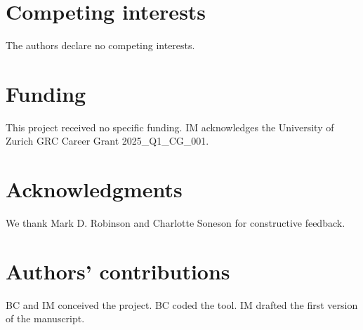 \documentclass[10pt]{article}
\newcommand{\beginsupplement}{%
        \setcounter{table}{0}
        \renewcommand{\thetable}{S\arabic{table}}%
        \setcounter{figure}{0}
        \renewcommand{\thefigure}{S\arabic{figure}}%
        \setcounter{section}{0}
        \renewcommand{\thesection}{S\arabic{section}}%
      }
\begin{document}
\section*{Competing interests}

The authors declare no competing interests.

\section*{Funding}

This project received no specific funding. IM acknowledges the University of Zurich GRC Career Grant 2025\_Q1\_CG\_001.

\section*{Acknowledgments}

We thank Mark D. Robinson and Charlotte Soneson for constructive feedback.

\section*{Authors' contributions}

BC and IM conceived the project. BC coded the tool. IM drafted the first version of the manuscript.




\clearpage


\end{document}
